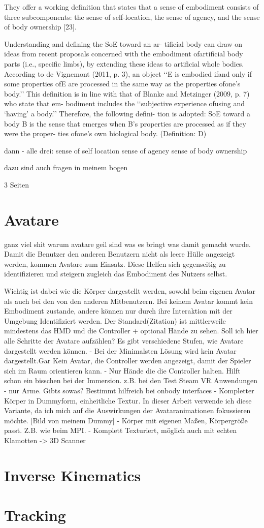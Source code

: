 They offer a working definition that states that a sense of embodiment consists of three subcomponents: the sense of self-location, the sense of agency, and the sense of body ownership [23].
\cite{Tham2018}

Understanding and defining the SoE toward an ar-
tificial body can draw on ideas from recent proposals concerned with the embodiment ofartificial body parts (i.e., specific limbs), by extending these ideas to artificial whole bodies. According to de Vignemont (2011, p. 3), an object ‘‘E is embodied ifand only if some properties ofE are processed in the same way as the properties ofone’s body.’’ This definition is in line with that of Blanke and Metzinger (2009, p. 7) who state that em- bodiment includes the ‘‘subjective experience ofusing and ‘having’ a body.’’ Therefore, the following defini- tion is adopted:
SoE toward a body B is the sense that emerges when
B’s properties are processed as if they were the proper- ties ofone’s own biological body. (Definition: D)
\cite{Kilteni2012}

dann - alle drei:
sense of self location
sense of agency
sense of body ownership

dazu sind auch fragen in meinem bogen



3 Seiten

\section{Avatare}
ganz viel shit warum avatare geil sind was es bringt was damit gemacht wurde.
Damit die Benutzer den anderen Benutzern nicht als leere Hülle angezeigt werden, kommen Avatare zum Einsatz. Diese Helfen sich gegenseitig zu identifizieren und steigern zugleich das Embodiment des Nutzers selbst. 

Wichtig ist dabei wie die Körper dargestellt werden, sowohl beim eigenen Avatar als auch bei den von den anderen Mitbenutzern. Bei keinem Avatar kommt kein Embodiment zustande, andere können nur durch ihre Interaktion mit der Umgebung Identifiziert werden. Der Standard(Zitation) ist mittlerweile mindestens das HMD und die Controller + optional Hände zu sehen. \cite{Benford2010}
Soll ich hier alle Schritte der Avatare aufzählen?
Es gibt verschiedene Stufen, wie Avatare dargestellt werden können.
- Bei der Minimalsten Lösung wird kein Avatar dargestellt.Gar Kein Avatar, die Controller werden angezeigt, damit der Spieler sich im Raum orientieren kann.
- Nur Hände die die Controller halten. Hilft schon ein bisschen bei der Immersion. z.B. bei den Test Steam VR Anwendungen
- nur Arme. Gibts sowas? Bestimmt hilfreich bei onbody interfaces
- Kompletter Körper in Dummyform, einheitliche Textur. In dieser Arbeit verwende ich diese Variante, da ich mich auf die Auswirkungen der Avataranimationen fokussieren möchte. 
[Bild von meinem Dummy]
- Körper mit eigenen Maßen, Körpergröße passt. Z.B. wie beim MPI. 
- Komplett Texturiert, möglich auch mit echten Klamotten -> 3D Scanner

\section{Inverse Kinematics}

\section{Tracking}







